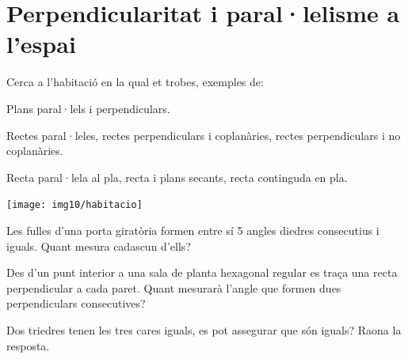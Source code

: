 
\section{Perpendicularitat i paral·lelisme a l'espai}

\begin{mylist}
	
\vspace{-2.5cm}
\exer \begin{minipage}[t]{0.6\textwidth}
Cerca a l'habitació en la qual et trobes, exemples de:
	
	\begin{tasks}
		\task  Plans paral·lels i perpendiculars. 
		
		\task  Rectes paral·leles, rectes perpendiculars i coplanàries, rectes perpendiculars i no coplanàries.
		
		\task  Recta paral·lela al pla, recta i plans secants, recta continguda en pla.
	\end{tasks}

\end{minipage}
\begin{minipage}{0.3\textwidth}
	\centering
	\vspace{2.5cm}
	\texttt{[image: img10/habitacio]}
\end{minipage}



\exer  Les fulles d'una porta giratòria formen entre sí 5 angles diedres consecutius i iguals. Quant mesura cadascun d'ells?

\exer  Des d'un punt interior a una sala de planta hexagonal regular es traça una recta perpendicular a cada paret. Quant mesurarà l'angle que formen dues perpendiculars consecutives?

\exer  Dos triedres tenen les tres cares iguals, es pot assegurar que són iguals? Raona la resposta.

\end{mylist}
 
